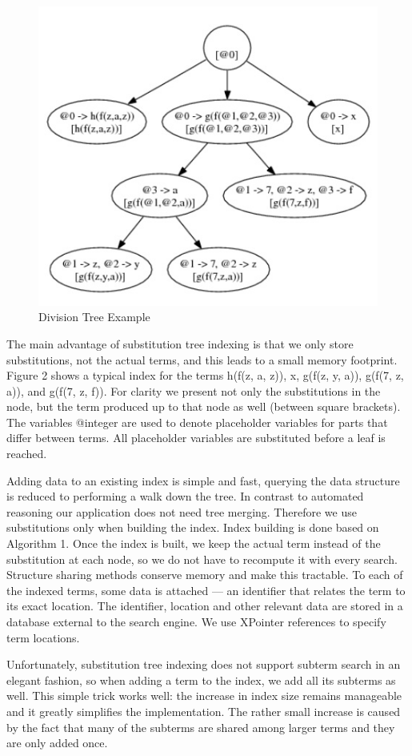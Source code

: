 \documentclass{deliverablereport}
\begin{document}
\begin{figure}[h]
\centering
 \includegraphics[scale=0.9]{figure1.jpg}
 \caption{Division Tree Example}
\end{figure}

The main advantage of substitution tree indexing is that we only store substitutions, not the actual terms, and this leads to a small memory footprint. Figure 2 shows a typical index for the terms h(f(z, a, z)), x, g(f(z, y, a)), g(f(7, z, a)), and g(f(7, z, f)). For clarity we present not only the substitutions in the node, but the term produced up to that node as well (between square brackets). The variables @integer are used to denote placeholder variables for parts that differ between terms. All placeholder variables are substituted before a leaf is reached. \par

Adding data to an existing index is simple and fast, querying the data structure is reduced to performing a walk down the tree. In contrast to automated reasoning our application does not need tree merging. Therefore we use substitutions only when building the index. Index building is done based on Algorithm 1. Once the index is built, we keep the actual term instead of the substitution at each node, so we do not have to recompute it with every search. Structure sharing methods conserve memory and make this tractable. To each of the indexed terms, some data is attached — an identifier that relates the term to its exact location. The identifier, location and other relevant data are stored in a database external to the search engine. We use XPointer references to specify term locations. \par
Unfortunately, substitution tree indexing does not support subterm search in an elegant fashion, so when adding a term to the index, we add all its subterms as well. This simple trick works well: the increase in index size remains manageable and it greatly simplifies the implementation. The rather small increase is caused by the fact that many of the subterms are shared among larger terms and they are only added once. \par
\end{document}
